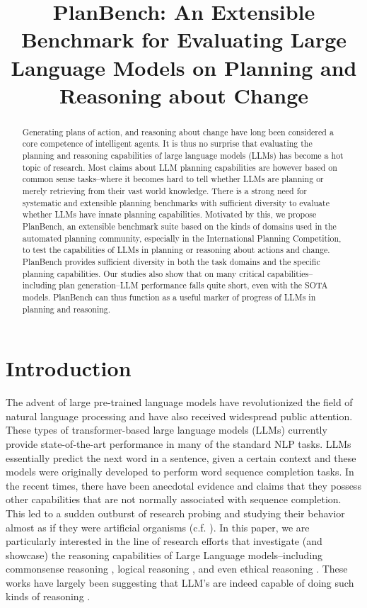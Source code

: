 \title{PlanBench: An Extensible Benchmark for Evaluating Large Language Models on Planning and Reasoning about Change}



\maketitle
\begin{abstract}
Generating plans of action, and reasoning about change have long been considered a core competence of intelligent agents. It is thus no surprise that evaluating the planning and reasoning capabilities of large language models (LLMs) has become a hot topic of research. Most claims about LLM planning capabilities are however based on common sense tasks–where it becomes hard to tell whether LLMs are planning or merely retrieving from their vast world knowledge. There is a strong need for systematic and extensible planning benchmarks with sufficient diversity to evaluate whether LLMs have innate planning capabilities. Motivated by this, we propose PlanBench, an extensible benchmark suite based on the kinds of domains used in the automated planning community, especially in the International Planning Competition, to test the capabilities of LLMs in planning or reasoning about actions and change. PlanBench provides sufficient diversity in both the task domains and the specific planning capabilities. Our studies also show that on many critical capabilities–including plan generation–LLM performance falls quite short, even with the SOTA models. PlanBench can thus function as a useful marker of progress of LLMs in planning and reasoning.
\end{abstract}
\section{Introduction}
The advent of large pre-trained language models have revolutionized the field of natural language processing and have also received widespread public attention. These types of transformer-based large language models (LLMs) currently provide state-of-the-art performance in many of the standard NLP tasks.
LLMs essentially predict the next word in a sentence, given a certain context and these models were originally developed to perform word sequence completion tasks. In the recent times, there have been anecdotal evidence and claims that they possess other capabilities that are not normally associated with sequence completion. This led to a sudden outburst of research probing and studying their behavior almost as if they were artificial organisms (c.f. \cite{kambhampati_2022}). In this paper, we are particularly interested in the line of research efforts that investigate (and showcase) the reasoning capabilities of Large Language models--including commonsense reasoning \cite{talmor2018commonsenseqa,sakaguchi2020winogrande, geva2021did}, logical reasoning \cite{bigbench}, and even ethical reasoning \cite{Jiang2021DelphiTM}. These works have largely been suggesting that LLM’s are indeed capable of doing such kinds of reasoning \cite{kojima2022large, wei2022chain, chowdhery2022palm}.

